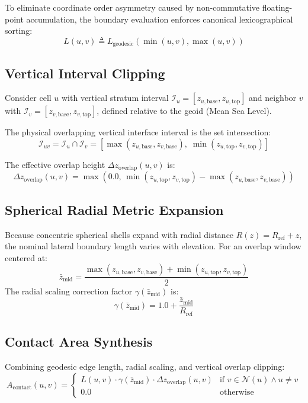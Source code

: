 \documentclass[11pt,a4paper]{article}
\theoremstyle{definition}
\begin{document}
To eliminate coordinate order asymmetry caused by non-commutative floating-point accumulation, the boundary evaluation enforces canonical lexicographical sorting:
\begin{equation}
L(u, v) \triangleq L_{\text{geodesic}}(\min(u, v), \max(u, v))
\end{equation}

\subsection{Vertical Interval Clipping}
Consider cell $u$ with vertical stratum interval $\mathcal{I}_u = [z_{u,\text{base}}, z_{u,\text{top}}]$ and neighbor $v$ with $\mathcal{I}_v = [z_{v,\text{base}}, z_{v,\text{top}}]$, defined relative to the geoid (Mean Sea Level).

The physical overlapping vertical interface interval is the set intersection:
\begin{equation}
\mathcal{I}_{uv} = \mathcal{I}_u \cap \mathcal{I}_v = \left[\max(z_{u,\text{base}}, z_{v,\text{base}}), \; \min(z_{u,\text{top}}, z_{v,\text{top}})\right]
\end{equation}

The effective overlap height $\Delta z_{\text{overlap}}(u, v)$ is:
\begin{equation}
\Delta z_{\text{overlap}}(u, v) = \max\left(0.0, \, \min(z_{u,\text{top}}, z_{v,\text{top}}) - \max(z_{u,\text{base}}, z_{v,\text{base}})\right)
\end{equation}

\subsection{Spherical Radial Metric Expansion}
Because concentric spherical shells expand with radial distance $R(z) = R_{\text{ref}} + z$, the nominal lateral boundary length varies with elevation. For an overlap window centered at:
\begin{equation}
\bar{z}_{\text{mid}} = \frac{\max(z_{u,\text{base}}, z_{v,\text{base}}) + \min(z_{u,\text{top}}, z_{v,\text{top}})}{2}
\end{equation}
The radial scaling correction factor $\gamma(\bar{z}_{\text{mid}})$ is:
\begin{equation}
\gamma(\bar{z}_{\text{mid}}) = 1.0 + \frac{\bar{z}_{\text{mid}}}{R_{\text{ref}}}
\end{equation}

\subsection{Contact Area Synthesis}
Combining geodesic edge length, radial scaling, and vertical overlap clipping:
\begin{equation}
A_{\text{contact}}(u, v) = 
\begin{cases}
L(u, v) \cdot \gamma(\bar{z}_{\text{mid}}) \cdot \Delta z_{\text{overlap}}(u, v) & \text{if } v \in \mathcal{N}(u) \land u \neq v \\
0.0 & \text{otherwise}
\end{cases}
\end{equation}
\end{document}
